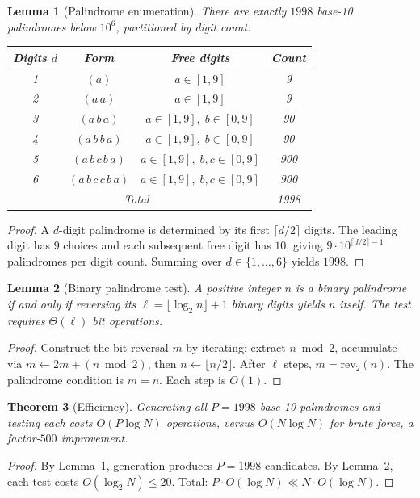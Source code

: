 \documentclass[12pt]{article}
\newtheorem{theorem}{Theorem}
\newtheorem{lemma}[theorem]{Lemma}
\theoremstyle{definition}
\begin{document}
\begin{lemma}[Palindrome enumeration]
\label{lem:enum}
There are exactly $1998$ base-10 palindromes below $10^6$, partitioned by digit count:
\begin{center}
\begin{tabular}{cccc}
\hline
Digits $d$ & Form & Free digits & Count \\
\hline
1 & $(a)$ & $a \in [1,9]$ & 9 \\
2 & $(a\,a)$ & $a \in [1,9]$ & 9 \\
3 & $(a\,b\,a)$ & $a \in [1,9],\; b \in [0,9]$ & 90 \\
4 & $(a\,b\,b\,a)$ & $a \in [1,9],\; b \in [0,9]$ & 90 \\
5 & $(a\,b\,c\,b\,a)$ & $a \in [1,9],\; b,c \in [0,9]$ & 900 \\
6 & $(a\,b\,c\,c\,b\,a)$ & $a \in [1,9],\; b,c \in [0,9]$ & 900 \\
\hline
\multicolumn{3}{c}{Total} & 1998 \\
\hline
\end{tabular}
\end{center}
\end{lemma}
\begin{proof}
A $d$-digit palindrome is determined by its first $\lceil d/2 \rceil$ digits. The leading digit has $9$ choices and each subsequent free digit has $10$, giving $9 \cdot 10^{\lceil d/2 \rceil - 1}$ palindromes per digit count. Summing over $d \in \{1,\ldots,6\}$ yields $1998$.
\end{proof}

\begin{lemma}[Binary palindrome test]
\label{lem:bintest}
A positive integer $n$ is a binary palindrome if and only if reversing its $\ell = \lfloor \log_2 n \rfloor + 1$ binary digits yields $n$ itself. The test requires $\Theta(\ell)$ bit operations.
\end{lemma}
\begin{proof}
Construct the bit-reversal $m$ by iterating: extract $n \bmod 2$, accumulate via $m \leftarrow 2m + (n \bmod 2)$, then $n \leftarrow \lfloor n/2 \rfloor$. After $\ell$ steps, $m = \mathrm{rev}_2(n)$. The palindrome condition is $m = n$. Each step is $O(1)$.
\end{proof}

\begin{theorem}[Efficiency]
Generating all $P = 1998$ base-10 palindromes and testing each costs $O(P \log N)$ operations, versus $O(N \log N)$ for brute force, a factor-$500$ improvement.
\end{theorem}
\begin{proof}
By Lemma~\ref{lem:enum}, generation produces $P = 1998$ candidates. By Lemma~\ref{lem:bintest}, each test costs $O(\log_2 N) \le 20$. Total: $P \cdot O(\log N) \ll N \cdot O(\log N)$.
\end{proof}
\end{document}
